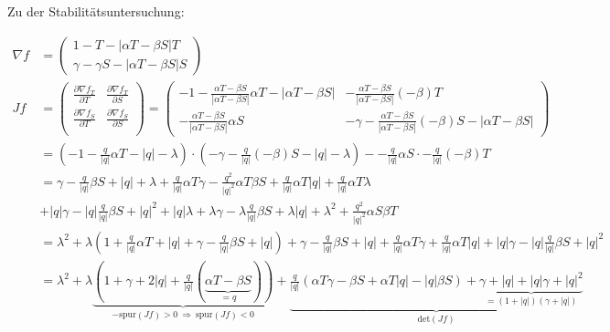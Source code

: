 \documentclass[a4paper,twoside]{article}
\begin{document}
	\noindent Zu der Stabilitätsuntersuchung:
	\begin{footnotesize}
	\begin{align*}
		\nabla f &= \left(\begin{array}{c}
			1 - T - |\alpha T - \beta S|T \\
			\gamma - \gamma S - |\alpha T - \beta S|S
		\end{array}\right) \\
		Jf &= \left(\begin{array}{cc}
			\frac{\partial \nabla f_T}{\partial T} & \frac{\partial \nabla f_T}{\partial S} \\
			\frac{\partial \nabla f_S}{\partial T} & \frac{\partial \nabla f_S}{\partial S} \\
		\end{array}\right) = \left(\begin{array}{cc}
			-1 - \frac{\alpha T - \beta S}{|\alpha T - \beta S|}\alpha T - |\alpha T - \beta S| &
			-\frac{\alpha T - \beta S}{|\alpha T - \beta S|}(-\beta) T \\
			-\frac{\alpha T - \beta S}{|\alpha T - \beta S|}\alpha S &
			-\gamma -\frac{\alpha T - \beta S}{|\alpha T - \beta S|}(-\beta) S - |\alpha T - \beta S|
		\end{array}\right) \\
		&= \left(-1 - \frac{q}{|q|}\alpha T - |q| - \lambda\right)\cdot \left( -\gamma - \frac{q}{|q|}(-\beta) S - |q|- \lambda \right) - -\frac{q}{|q|}\alpha S \cdot  -\frac{q}{|q|}(-\beta) T \\
		&= \gamma - \frac{q}{|q|}\beta S + |q| + \lambda 
		+ \frac{q}{|q|}\alpha T\gamma - \frac{q^2}{|q|^2}\alpha T \beta S + \frac{q}{|q|} \alpha T |q| + \frac{q}{|q|}\alpha T\lambda \\
		&+ |q|\gamma - |q|\frac{q}{|q|} \beta S + |q|^2 + |q|\lambda
		+ \lambda \gamma - \lambda\frac{q}{|q|}\beta S + \lambda|q| + \lambda^2
		+ \frac{q^2}{|q|^2}\alpha S \beta T \\
		&= \lambda^2 + \lambda\left( 1 + \frac{q}{|q|}\alpha T + |q| + \gamma - \frac{q}{|q|}\beta S + |q| \right) 
		+ \gamma - \frac{q}{|q|}\beta S + |q| + \frac{q}{|q|}\alpha T \gamma + \frac{q}{|q|}\alpha T |q| + |q|\gamma - |q|\frac{q}{|q|}\beta S + |q|^2 \\
		&= \lambda^2 + \lambda \underbrace{\left( 
		1  + \gamma + 2|q| + \frac{q}{|q|} \left( \underbrace{\alpha T - \beta S}_{=q} \right)
		\right)}_{-\textrm{spur}(Jf) > 0 ~\Rightarrow~ \textrm{spur}(Jf) < 0} +
		\underbrace{
			\frac{q}{|q|}\left(\alpha T \gamma - \beta S + \alpha T |q| - |q|\beta S\right)
			 + \underbrace{\gamma + |q| + |q|\gamma + |q|^2}_{=(1 + |q|)(\gamma + |q|)}
		}_{\textrm{det}(Jf)}
	\end{align*}		
	\end{footnotesize}
\end{document}
